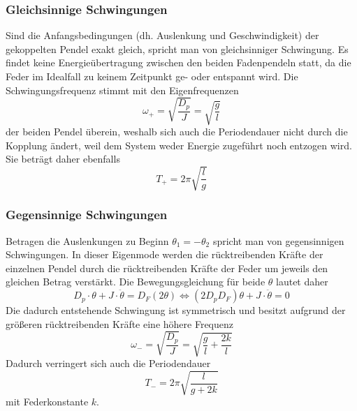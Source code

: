     \subsubsection{Gleichsinnige Schwingungen}
        Sind die Anfangsbedingungen (dh. Auslenkung und Geschwindigkeit) der gekoppelten
        Pendel exakt gleich, spricht man von gleichsinniger Schwingung.
        Es findet keine Energieübertragung zwischen den beiden Fadenpendeln statt, da die 
        Feder im Idealfall zu keinem Zeitpunkt ge- oder entspannt wird. Die Schwingungsfrequenz
        stimmt mit den Eigenfrequenzen 
        \begin{equation}
            \omega_+= \sqrt{\dfrac{D_p}{J}}=\sqrt{\dfrac{g}{l}}
        \end{equation}
        der beiden Pendel überein, weshalb sich auch 
        die Periodendauer nicht durch die Kopplung ändert, weil dem System weder Energie 
        zugeführt noch entzogen wird. Sie beträgt daher ebenfalls 
        \begin{equation}
            T_+ = 2\pi \sqrt{\dfrac{l}{g}}
        \end{equation}
    \subsubsection{Gegensinnige Schwingungen}
        Betragen die Auslenkungen zu Beginn $\theta_1=-\theta_2$ spricht man von gegensinnigen
        Schwingungen. In dieser Eigenmode werden die rücktreibenden Kräfte der einzelnen Pendel 
        durch die rücktreibenden Kräfte der Feder um jeweils den gleichen Betrag verstärkt. Die 
        Bewegungsgleichung für beide $\theta$ lautet daher
        \begin{equation}
            D_p \cdot \theta +J\cdot \ddot \theta =D_F(2\theta)\Leftrightarrow 
            (2 D_p D_F) \theta +J\cdot \ddot \theta =0
        \end{equation}
        Die dadurch entstehende Schwingung ist symmetrisch und besitzt aufgrund der größeren 
        rücktreibenden Kräfte eine höhere Frequenz
        \begin{equation}
            \omega_-= \sqrt{\dfrac{D_p}{J}}=\sqrt{\dfrac{g}{l}+\dfrac{2 k}{l}}
        \end{equation}
        Dadurch verringert sich auch die Periodendauer
        \begin{equation}
            T_- = 2\pi \sqrt{\dfrac{l}{g+2k}}
        \end{equation}
        mit Federkonstante $k$.

